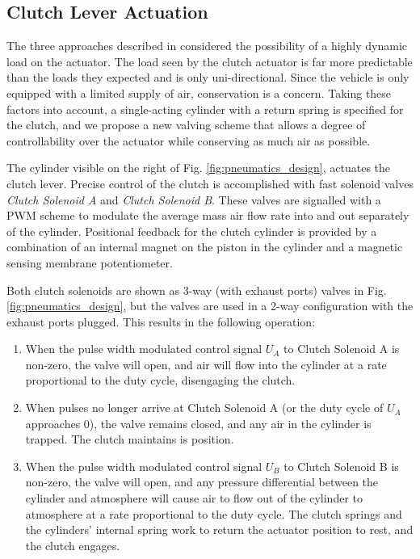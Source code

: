 \subsection{Clutch Lever Actuation}

The three approaches described in \cite{pneumatic_actuator, adaptive_pneumatic, accurate_position} considered the possibility of a highly dynamic load on the actuator. The load seen by the clutch actuator is far more predictable than the loads they expected and is only uni-directional. Since the vehicle is only equipped with a limited supply of air, conservation is a concern. Taking these factors into account, a single-acting cylinder with a return spring is specified for the clutch, and we propose a new valving scheme that allows a degree of controllability over the actuator while conserving as much air as possible.

The cylinder visible on the right of Fig. \ref{fig:pneumatics_design}, actuates the clutch lever. Precise control of the clutch is accomplished with fast solenoid valves \emph{Clutch Solenoid A} and \emph{Clutch Solenoid B}. These valves are signalled with a PWM scheme to modulate the average mass air flow rate into and out separately of the cylinder. Positional feedback for the clutch cylinder is provided by a combination of an internal magnet on the piston in the cylinder and a magnetic sensing membrane potentiometer.

Both clutch solenoids are shown as 3-way (with exhaust ports) valves in Fig. \ref{fig:pneumatics_design}, but the valves are used in a 2-way configuration with the exhaust ports plugged.  This results in the following operation:

\begin{enumerate}
  \item When the pulse width modulated control signal $U_A$ to Clutch Solenoid A is non-zero, the valve will open, and air will flow into the cylinder at a rate proportional to the duty cycle, disengaging the clutch.
  \item When pulses no longer arrive at Clutch Solenoid A (or the duty cycle of $U_A$ approaches 0), the valve remains closed, and any air in the cylinder is trapped. The clutch maintains is position.
  \item When the pulse width modulated control signal $U_B$ to Clutch Solenoid B is non-zero, the valve will open, and any pressure differential between the cylinder and atmosphere will cause air to flow out of the cylinder to atmosphere at a rate proportional to the duty cycle. The clutch springs and the cylinders' internal spring work to return the actuator position to rest, and the clutch engages.
\end{enumerate}

